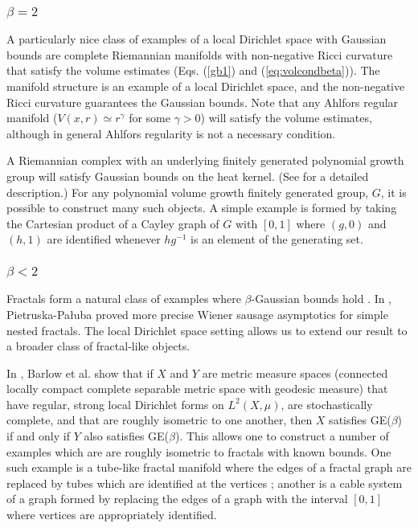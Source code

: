 \documentclass[letterpaper,oneside,english]{amsart}
\begin{document}
\subsubsection{$\beta=2$}\label{Beta2}
A particularly nice class of examples of a local Dirichlet space with Gaussian bounds are complete Riemannian manifolds with non-negative Ricci curvature that satisfy the volume estimates (Eqs. (\ref{gb1}) and (\ref{eq:volcondbeta})).  The manifold structure is an example of a local Dirichlet space, and the non-negative Ricci curvature guarantees the Gaussian bounds.  Note that any Ahlfors regular manifold ($V(x,r)\simeq r^{\gamma}$ for some $\gamma>0$) will satisfy the volume estimates, although in general Ahlfors regularity is not a necessary condition. 

A Riemannian complex with an underlying finitely generated polynomial growth group will satisfy Gaussian bounds on the heat kernel.  (See \cite{PivarskiLSC} for a detailed description.)  For any polynomial volume growth finitely generated group, $G$, it is possible to construct many such objects.   A simple example is formed by taking the Cartesian product of a Cayley graph of $G$ with  $ [0,1]$ where $(g,0)$ and $(h,1)$ are identified whenever $hg^{-1}$ is an element of the generating set.  

\subsubsection{$\beta <2$}\label{Betalessthan2}
Fractals form a natural class of examples where $\beta$-Gaussian bounds hold \cite{Barlow}.  In \cite{P-P}, Pietruska-Pa{\l}uba proved more precise Wiener sausage asymptotics for simple nested fractals.  The local Dirichlet space setting allows us to extend our result to a broader class of fractal-like objects.

In \cite{BBK}, Barlow et al. show that if $X$ and $Y$ are metric measure spaces (connected locally compact complete separable metric space with geodesic measure) that have regular, strong local Dirichlet forms on $L^2(X, \mu)$, are stochastically complete, and that are roughly isometric to one another,  then $X$ satisfies GE($\beta$) if and only if $Y$ also satisfies GE($\beta$).
This allows one to construct a number of examples which are are roughly isometric to fractals with known bounds.  One such example is a tube-like fractal manifold where the edges of a fractal graph are replaced by tubes which are identified at the vertices \cite{BBK}; another is a cable system of a graph formed by replacing the edges of a graph with the interval $[0,1]$ where vertices are appropriately identified.  
\end{document}
